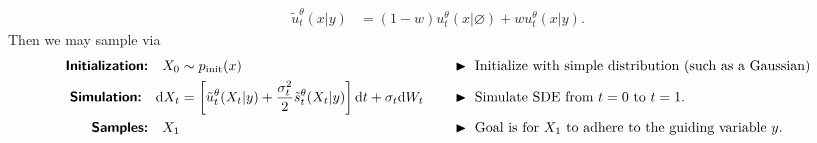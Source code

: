 \begin{summarybox}
\begin{align*}
    \tilde{u}^\theta_t(x|y) &= (1-w) u_t^\theta(x|\varnothing) + wu_t^\theta (x|y).
\end{align*}
Then we may sample via
\begin{alignat*}{3}
    \textbf{\sffamily Initialization:}\quad X_0&\sim\pinit(x) \quad  && \blacktriangleright\,\,\text{Initialize with simple distribution (such as a Gaussian)}\\
    \textbf{\sffamily Simulation:}\quad \dd X_t &= \left[\tilde{u}_t^\theta(X_t|y)+\frac{\sigma_t^2}{2}\tilde{s}_t^\theta(X_t|y)\right]\dd t + \sigma_t\dd W_t \quad && \blacktriangleright\,\,\text{Simulate SDE from $t=0$ to $t=1$.}\\
    \textbf{\sffamily Samples:}\quad X_1& \quad && \blacktriangleright\,\,\text{Goal is for $X_1$ to adhere to the guiding variable $y$.}
\end{alignat*}


\end{summarybox}
